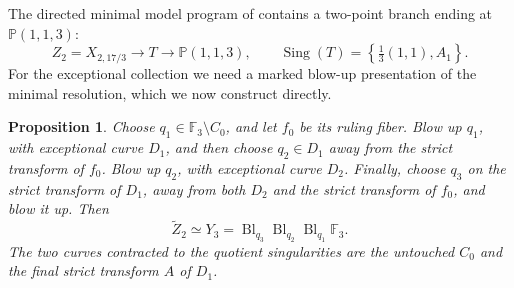 \documentclass[11pt]{article}
\theoremstyle{plain}
\newtheorem{proposition}[proposition]{Proposition}
\theoremstyle{definition}
\theoremstyle{remark}
\newcommand{\Pp}{\mathbb P}
\newcommand{\F}{\mathbb F}
\newcommand{\Sing}{\operatorname{Sing}}
\newcommand{\Bl}{\operatorname{Bl}}
\begin{document}
The directed minimal model program of \cite[Section~6]{Corti2016} contains a two-point branch
ending at \(\Pp(1,1,3)\):
\[
Z_2=X_{2,17/3}\longrightarrow T\longrightarrow\Pp(1,1,3),
\qquad \Sing(T)=\left\{\tfrac13(1,1),A_1\right\}.
\]
For the exceptional collection we need a marked blow-up presentation of the
minimal resolution, which we now construct directly.

\begin{proposition}\label{prop:explicit-base-two}
Choose \(q_1\in\F_3\setminus C_0\), and let \(f_0\) be its ruling
fiber. Blow up \(q_1\), with exceptional curve \(D_1\), and then choose
\(q_2\in D_1\) away from the strict transform of \(f_0\). Blow up
\(q_2\), with exceptional curve \(D_2\). Finally, choose \(q_3\) on
the strict transform of \(D_1\), away from both \(D_2\) and the strict
transform of \(f_0\), and blow it up. Then
\[
\widetilde Z_2\simeq
Y_3=\Bl_{q_3}\Bl_{q_2}\Bl_{q_1}\F_3.
\]
The two curves contracted to the quotient singularities are the untouched
\(C_0\) and the final strict transform \(A\) of \(D_1\).
\end{proposition}
\end{document}
